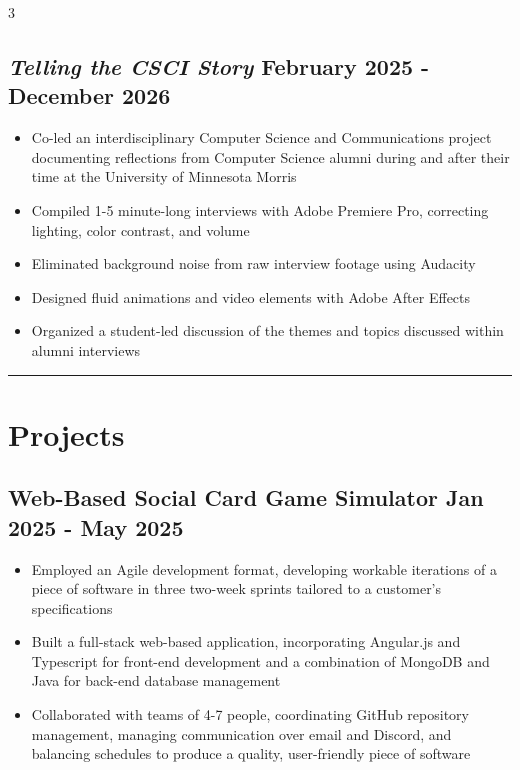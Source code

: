 \documentclass{article}
\newcommand{\makedivider}[1]{\textcolor{black!20}{\rule{\textwidth}{#1}}}%
\newcommand{\dateto}[1]{
\normalsize
\textnormal{\hfill#1}}%
\begin{document}
\begin{paracol}{3}
\begin{tcolorbox}[colback=white, left=0.5in, right =0.5in, top=0.1in, breakable, colframe=white]
    \subsection*{\textit{Telling the CSCI Story}\dateto{February 2025 - December 2026}}
    \begin{itemize}
        \item Co-led an interdisciplinary Computer Science and Communications project documenting reflections from Computer Science alumni during and after their time at the University of Minnesota Morris
        \item Compiled 1-5 minute-long interviews with Adobe Premiere Pro, correcting lighting, color contrast, and volume
        \item Eliminated background noise from raw interview footage using Audacity
        \item Designed fluid animations and video elements with Adobe After Effects
        \item Organized a student-led discussion of the themes and topics discussed within alumni interviews
    \end{itemize}
    
    \vspace{0.25in}
    \makedivider{0.05in}
    \section*{Projects}
    \subsection*{{Web-Based Social Card Game Simulator}\dateto{Jan 2025 - May 2025}}
    \begin{itemize}
        \item Employed an Agile development format, developing workable iterations of a piece of software in three two-week sprints tailored to a customer's specifications
        \item Built a full-stack web-based application, incorporating Angular.js and Typescript for front-end development and a combination of MongoDB and Java for back-end database management
        \item Collaborated with teams of 4-7 people, coordinating GitHub repository management, managing communication over email and Discord, and balancing schedules to produce a quality, user-friendly piece of software
    \end{itemize}

\end{tcolorbox}
\end{paracol}
\end{document}
